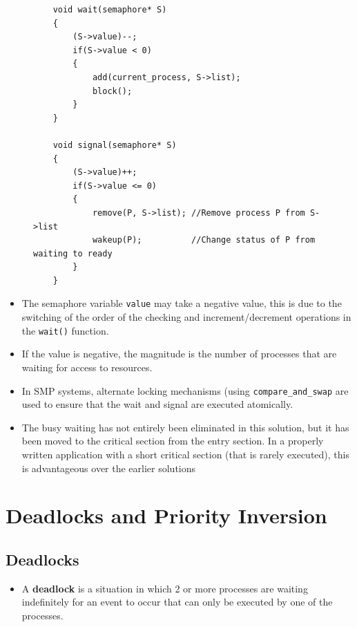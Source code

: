 \documentclass{article}
\theoremstyle{plain}
\theoremstyle{definition}
\begin{document}
\begin{figure}[!h]
\centering
\begin{verbatim}
    void wait(semaphore* S)
    {
        (S->value)--;
        if(S->value < 0)
        {
            add(current_process, S->list);
            block();
        }
    }
    
    void signal(semaphore* S)
    {
        (S->value)++;
        if(S->value <= 0)
        {
            remove(P, S->list); //Remove process P from S->list
            wakeup(P);          //Change status of P from waiting to ready
        }
    }
\end{verbatim}
\end{figure}

\begin{itemize}
    \item The semaphore variable \texttt{value} may take a negative value, this is due to the switching of the order of the checking and increment/decrement operations in the \texttt{wait()} function. 
    
    \item If the value is negative, the magnitude is the number of processes that are waiting for access to resources. 
    
    \item In SMP systems, alternate locking mechanisms (using \texttt{compare\_and\_swap} are used to ensure that the wait and signal are executed atomically.
    
    \item The busy waiting has not entirely been eliminated in this solution, but it has been moved to the critical section from the entry section. In a properly written application with a short critical section (that is rarely executed), this is advantageous over the earlier solutions
    
\end{itemize}
\section{Deadlocks and Priority Inversion}
\subsection{Deadlocks}
\begin{itemize}
    \item A \textbf{deadlock} is a situation in which 2 or more processes are waiting indefinitely for an event to occur that can only be executed by one of the processes.
\end{itemize} 
\end{document}
